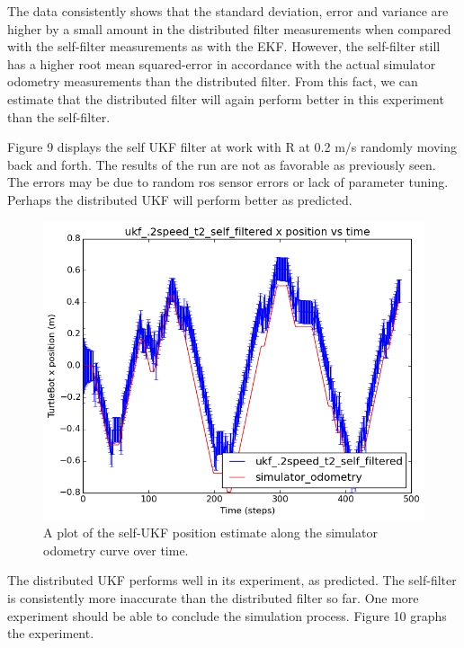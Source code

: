 \documentclass[conference]{IEEEtran} \usepackage[T1]{fontenc} \usepackage[backend=biber, style=ieee]{biblatex}
\begin{document}

The data consistently shows that the standard deviation, error and variance are higher by a small amount in 
the distributed filter measurements when compared with the self-filter measurements as with the EKF. However, 
the self-filter still has a higher root mean squared-error in accordance with the actual simulator odometry 
measurements than the distributed filter. From this fact, we can estimate that the distributed filter will 
again perform better in this experiment than the self-filter.

Figure 9 displays the self UKF filter at work with R at 0.2 m/s randomly moving back 
and forth. The results of the run are not as favorable as previously seen. The 
errors may be due to random ros sensor errors or lack of parameter tuning. Perhaps 
the distributed UKF will perform better as predicted.

\begin{figure}[!ht]
\label{pic9} 
\centering 
\includegraphics[scale=.45]{ukf_2speed_t2_self_filtered_pos_err_graph}
\caption {A plot of the self-UKF position estimate along the simulator odometry curve over time.}
\end{figure}

The distributed UKF performs well in its experiment, as predicted. The self-filter 
is consistently more inaccurate than the distributed filter so far. One more 
experiment should be able to conclude the simulation process. Figure 10 graphs the 
experiment. 
\end{document}
